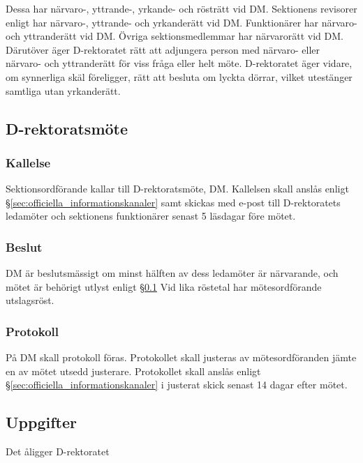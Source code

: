 \documentclass{dgovdoc}
\begin{document}
Dessa har närvaro-, yttrande-, yrkande- och rösträtt vid DM. Sektionens
revisorer enligt har närvaro-, yttrande- och yrkanderätt vid DM. Funktionärer
har närvaro- och yttranderätt vid DM. Övriga sektionsmedlemmar har närvarorätt
vid DM. Därutöver äger D-rektoratet rätt att adjungera person med närvaro-
eller närvaro- och yttranderätt för viss fråga eller helt möte. D-rektoratet
äger vidare, om synnerliga skäl föreligger, rätt att besluta om lyckta dörrar,
vilket utestänger samtliga utan yrkanderätt.

\subsection{D-rektoratsmöte}
\label{sec:d_rektoratsmote}

\subsubsection{Kallelse}

Sektionsordförande kallar till D-rektoratsmöte, DM. Kallelsen skall anslås
enligt \S\ref{sec:officiella_informationskanaler} samt skickas med e-post till
D-rektoratets ledamöter och sektionens funktionärer senast 5 läsdagar före
mötet.

\subsubsection{Beslut}

DM är beslutsmässigt om minst hälften av dess ledamöter är närvarande, och
mötet är behörigt utlyst enligt \S\ref{sec:d_rektoratsmote} Vid lika röstetal har
mötesordförande utslagsröst.

\subsubsection{Protokoll}

På DM skall protokoll föras. Protokollet skall justeras av mötesordföranden
jämte en av mötet utsedd justerare. Protokollet skall anslås enligt
\S\ref{sec:officiella_informationskanaler} i justerat skick senast 14 dagar efter
mötet.

\subsection{Uppgifter}

Det åligger D-rektoratet
\end{document}
